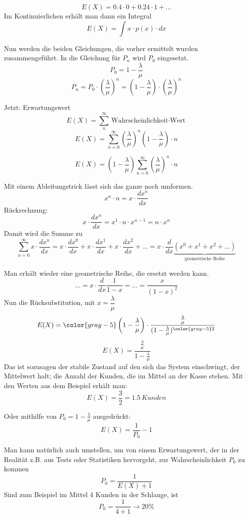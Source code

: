 \documentclass[11pt, a4paper]{article}
\begin{document}
\[E(X) = 0.4 \cdot 0 + 0.24 \cdot 1 + ...\]
Im Kontinuierlichen erhält man dann ein Integral
\[E(X) = \int{x \cdot p(x) \cdot dx}\]

Nun werden die beiden Gleichungen, die vorher ermittelt wurden zusammengeführt. In die Gleichung für $P_{n}$ wird $P_{0}$ eingesetzt.
\[P_{0} = 1-\frac{\lambda}{\mu}\]
\[P_{n} = P_{0} \cdot \left(\frac{\lambda}{\mu}\right)^{n} = \left(1 - \frac{\lambda}{\mu}\right) \cdot \left(\frac{\lambda}{\mu}\right)^{n}\]

Jetzt: Erwartungswert
\[E(X) = \sum_{n}^{\infty}{\text{Wahrscheinlichkeit} \cdot \text{Wert}}\]
\[E(X) = \sum_{n=0}^{\infty}{(\frac{\lambda}{\mu})^{n} (1-\frac{\lambda}{\mu}) \cdot n}\]

\[\boxed{E(X) = \left(1-\frac{\lambda}{\mu}\right) \sum_{n=0}^{\infty}{(\frac{\lambda}{\mu})^{n} \cdot n}}\]

Mit einem Ableitungstrick lässt sich das ganze noch umformen.
\[x^{n} \cdot n = x \cdot \frac{dx^{n}}{dx}\]
Rückrechnung:
\[ x \cdot \frac{dx^{n}}{dx} = x^{1} \cdot n \cdot x^{n-1} = n \cdot x^{n}\]
Damit wird die Summe zu
\[\sum_{n=0}^{\infty}{x \cdot \frac{dx^{n}}{dx}} = x \cdot \frac{dx^{0}}{dx} + x \cdot \frac{dx^{1}}{dx} + x \cdot \frac{dx^{2}}{dx} + ...=
  x \cdot \frac{d}{dx}\underbrace{\left(x^{0} +x^{1} + x^{2}+ ...\right)}_{\text{geometrische Reihe}}\]

Man erhält wieder eine geometrische Reihe, die ersetzt werden kann.
\[...=x\cdot \frac{d}{dx}{\frac{1}{1-x}} = ... = \frac{x}{(1-x)^{2}}\]
Nun die Rücksubstitution, mit $x = \dfrac{\lambda}{\mu}$
\[E(X) = {\color{gray-5}\left(1-\frac{\lambda}{\mu}\right)} \cdot \frac{\frac{\lambda}{\mu}}{(1-\frac{\lambda}{\mu})^{\color{gray-5}2}}\]
\[E(X) = \frac{\frac{\lambda}{\mu}}{1-\frac{\lambda}{\mu}}\]
Das ist sozusagen der \glqq stabile Zustand\grqq{} auf den sich das System einschwingt, der Mittelwert halt; die Anzahl der Kunden, die im Mittel an der Kasse stehen.
Mit den Werten aus dem Beispiel erhält man:
\[E(X) = \frac{3}{2} = 1.5 \, \si{Kunden}\]

Oder mithilfe von $P_{0} = 1 - \frac{\lambda}{\mu}$ ausgedrückt:
\[E(X) = \frac{1}{P_{0}} - 1\]

Man kann natürlich auch umstellen, um von einem Erwartungswert, der in der Realität z.B. aus Tests oder Statistiken hervorgeht, zur Wahrscheinlichkeit $P_{0}$ zu kommen
\[P_{0} = \frac{1}{E(X) + 1}\]
Sind zum Beispiel im Mittel 4 Kunden in der Schlange, ist
\[P_{0} = \frac{1}{4+1} \rightarrow 20 \si{\percent}\]

\end{document}

